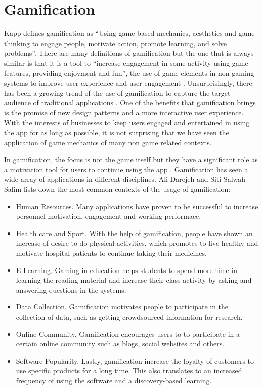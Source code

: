\section{Gamification}

Kapp defines gamification as “Using game-based mechanics, aesthetics and game thinking to engage people, motivate action, promote learning, and solve problems”. There are many definitions of gamification but the one that is always similar is that it is a tool to “increase engagement in some activity using game features, providing enjoyment and fun”, the use of game elements in non-gaming systems to improve user experience and user engagement \cite{karlmkapp2012}. Unsurprisingly, there has been a growing trend of the use of gamification to capture the target audience of traditional applications \cite{luisRodrigues2016}. One of the benefits that gamification brings is the promise of new design patterns and a more interactive user experience. With the interests of businesses to keep users engaged and entertained in using the app for as long as possible, it is not surprising that we have seen the application of game mechanics of many non game related contexts.

In gamification, the focus is not the game itself but they have a significant role as a motivation tool for users to continue using the app \cite{alidarejeh2016}. Gamification has seen a wide array of applications in different disciplines. Ali Darejeh and Siti Salwah Salim lists down the most common contexts of the usage of gamification:
\begin{itemize}
\item Human Resources. Many applications have proven to be successful to increase personnel motivation, engagement and working performace.
\item Health care and Sport. With the help of gamification, people have shown an increase of desire to do physical activities, which promotes to live healthy and motivate hospital patients to continue taking their medicines.
\item E-Learning. Gaming in education helps students to spend more time in learning the reading material and increase their class activity by asking and answering questions in the systems.
\item Data Collection. Gamification motivates people to participate in the collection of data, such as getting crowdsourced information for research.
\item Online Community. Gamification encourages users to to participate in a certain online community such as blogs, social websites and others.
\item Software Popularity. Lastly, gamification increase the loyalty of customers to use specific products for a long time. This also translates to an increased frequency of using the software and a discovery-based learning.
\end{itemize}

